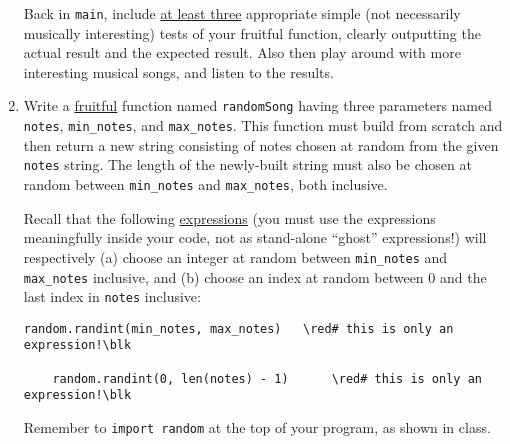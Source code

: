\documentclass[10pt]{article}
\newcommand{\blk}{\color{black}}
\newcommand{\red}{\color{red}}
\begin{document}
\begin{enumerate}
        \vspace*{6pt}
        Back in {\tt main}, include \uline{at least three} appropriate simple
        (not necessarily musically interesting) tests of your fruitful
        function, clearly outputting the actual result and the expected result.  
        Also then play around with more interesting musical songs, and
        listen to the results.

    \item Write a \uline{fruitful} function named {\tt randomSong} having 
        three parameters named {\tt notes}, {\tt min\_notes}, and {\tt max\_notes}.
        This function must build from scratch and then return a new string
        consisting of notes chosen at random from the given {\tt notes} string.
        The length of the newly-built string must also be chosen at random
        between {\tt min\_notes} and {\tt max\_notes}, both inclusive.

        Recall that the following \uline{expressions} (you must use the
        expressions meaningfully inside your code, not as stand-alone ``ghost''
        expressions!) will respectively (a) choose an integer at random between
        {\tt min\_notes} and {\tt max\_notes} inclusive, and (b) choose an
        index at random between 0 and the last index in {\tt notes} inclusive:
\begin{Verbatim}[commandchars=\\\{\}]
    random.randint(min_notes, max_notes)   \red# this is only an expression!\blk

    random.randint(0, len(notes) - 1)      \red# this is only an expression!\blk
\end{Verbatim}
        Remember to {\tt import random} at the top of your program, as shown
        in class.


\end{enumerate}
\end{document}
